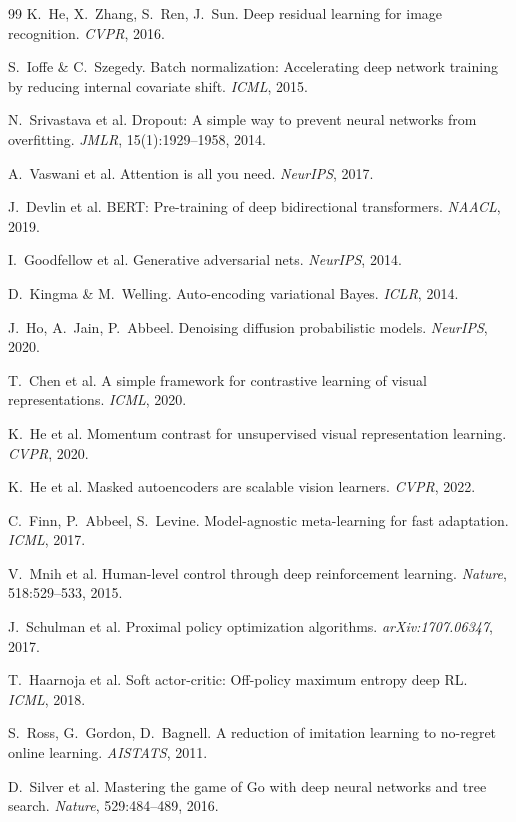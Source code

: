 \documentclass[12pt,a4paper]{article}
\theoremstyle{definition}
\begin{document}
\begin{thebibliography}{99}
 K.~He, X.~Zhang, S.~Ren, J.~Sun. Deep residual learning for image recognition. \textit{CVPR}, 2016.

 S.~Ioffe \& C.~Szegedy. Batch normalization: Accelerating deep network training by reducing internal covariate shift. \textit{ICML}, 2015.

 N.~Srivastava et al. Dropout: A simple way to prevent neural networks from overfitting. \textit{JMLR}, 15(1):1929--1958, 2014.

 A.~Vaswani et al. Attention is all you need. \textit{NeurIPS}, 2017.

 J.~Devlin et al. BERT: Pre-training of deep bidirectional transformers. \textit{NAACL}, 2019.

 I.~Goodfellow et al. Generative adversarial nets. \textit{NeurIPS}, 2014.

 D.~Kingma \& M.~Welling. Auto-encoding variational Bayes. \textit{ICLR}, 2014.

 J.~Ho, A.~Jain, P.~Abbeel. Denoising diffusion probabilistic models. \textit{NeurIPS}, 2020.

 T.~Chen et al. A simple framework for contrastive learning of visual representations. \textit{ICML}, 2020.

 K.~He et al. Momentum contrast for unsupervised visual representation learning. \textit{CVPR}, 2020.

 K.~He et al. Masked autoencoders are scalable vision learners. \textit{CVPR}, 2022.

 C.~Finn, P.~Abbeel, S.~Levine. Model-agnostic meta-learning for fast adaptation. \textit{ICML}, 2017.

 V.~Mnih et al. Human-level control through deep reinforcement learning. \textit{Nature}, 518:529--533, 2015.

 J.~Schulman et al. Proximal policy optimization algorithms. \textit{arXiv:1707.06347}, 2017.

 T.~Haarnoja et al. Soft actor-critic: Off-policy maximum entropy deep RL. \textit{ICML}, 2018.

 S.~Ross, G.~Gordon, D.~Bagnell. A reduction of imitation learning to no-regret online learning. \textit{AISTATS}, 2011.

 D.~Silver et al. Mastering the game of Go with deep neural networks and tree search. \textit{Nature}, 529:484--489, 2016.


\end{thebibliography}
\end{document}
